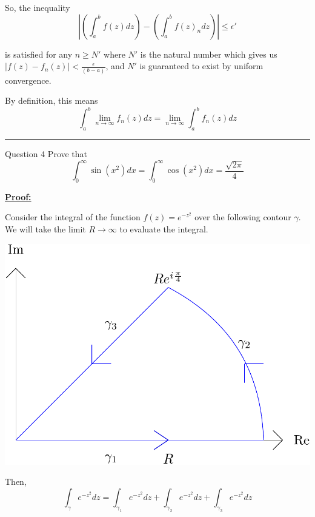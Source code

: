 \documentclass{article}
\begin{document}
So, the inequality
\[ \left| \left(\int_{a}^{b} f(z) dz\right) - \left(\int_a^b f(z)_n dz\right) \right| \leq \epsilon' \]

is satisfied for any $n \geq N'$ where $N'$ is the natural number which gives us $\left|f(z) - f_n(z)\right| < \frac{\epsilon}{(b-a)}$, and $N'$ is guaranteed to exist by uniform convergence. 

\vskip 0.5cm
By definition, this means
\[ \int_{a}^{b} \lim_{n \rightarrow \infty}  f_n(z) dz = \lim_{n \rightarrow \infty} \int_{a}^{b} f_n(z) dz  \]

\vskip 0.5cm
\hrule 
\vskip 0.5cm


\begin{mathdefinitionbox}{Question 4}
\vskip 0.5cm
Prove that 
\[ \int_{0}^{\infty} \sin\left( x^2 \right) dx = \int_{0}^{\infty} \cos\left( x^2 \right) dx = \frac{\sqrt{2\pi}}{4} \]
\end{mathdefinitionbox}

\vskip 0.5cm
\underline{\textbf{Proof:}}

Consider the integral of the function $f(z) = e^{-z^2}$ over the following contour $\gamma$. We will take the limit $R \rightarrow \infty$ to evaluate the integral.

\vskip 0.5cm
\begin{center}
  \includegraphics*[scale=0.20]{Q4.png}
\end{center}

Then, 
\[ \int_{\gamma} e^{-z^2} dz = \int_{{\gamma_1}} e^{-z^2} dz + \int_{{\gamma_2}} e^{-z^2} dz + \int_{{\gamma_3}} e^{-z^2} dz \]
\end{document}
